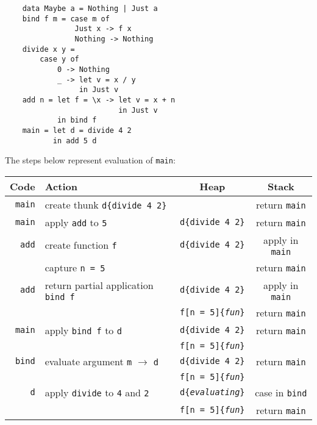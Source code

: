 \documentclass[en]{pracamgr}
\begin{document}
\begin{verbatim}
    data Maybe a = Nothing | Just a
    bind f m = case m of
                Just x -> f x
                Nothing -> Nothing
    divide x y =
        case y of
            0 -> Nothing
            _ -> let v = x / y
                 in Just v
    add n = let f = \x -> let v = x + n 
                          in Just v
            in bind f
    main = let d = divide 4 2
           in add 5 d
\end{verbatim}

The steps below represent evaluation of \texttt{main}:

\begin{center}
\begin{tabular}{r | l | c | c }
    Code & Action & Heap & Stack \\
    \hline
    \hline
    \texttt{main} & create thunk \texttt{d\{divide 4 2\}} &  & return \texttt{main} \\
    \hline
    \texttt{main} & apply \texttt{add} to \texttt{5} & \texttt{d\{divide 4 2\}} & return \texttt{main} \\
    \hline
    \texttt{add} & create function \texttt{f} & \texttt{d\{divide 4 2\}} & apply in \texttt{main} \\
    & capture \texttt{n = 5} & & return \texttt{main} \\
    \hline
    \texttt{add} & return partial application \texttt{bind f} & \texttt{d\{divide 4 2\}} & apply in \texttt{main} \\
    & & \texttt{f[n = 5]\{\textit{fun}\}} & return \texttt{main} \\
    \hline
    \texttt{main} & apply \texttt{bind f} to \texttt{d} & \texttt{d\{divide 4 2\}} & return \texttt{main} \\
    & & \texttt{f[n = 5]\{\textit{fun}\}} & \\
    \hline
    \texttt{bind} & evaluate argument \texttt{m} $\rightarrow$ \texttt{d} & \texttt{d\{divide 4 2\}} & return \texttt{main} \\
    & & \texttt{f[n = 5]\{\textit{fun}\}} & \\
    \hline
    \texttt{d} & apply \texttt{divide} to \texttt{4} and \texttt{2} & \texttt{d\{\textit{evaluating}\}} & case in \texttt{bind} \\
    & & \texttt{f[n = 5]\{\textit{fun}\}} & return \texttt{main} \\
    \hline
\end{tabular}
\end{center}
\end{document}
